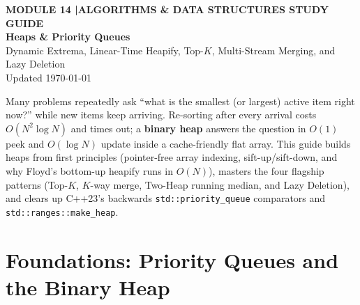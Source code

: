 \documentclass[11pt,a4paper]{article}
\newcommand{\sectionbreak}{}
\theoremstyle{definition}
\begin{document}
\thispagestyle{plain}
\begin{tcolorbox}[
    enhanced,
    colback=primaryblue!6, colframe=primaryblue!20,
    borderline west={5pt}{0pt}{primaryblue},
    arc=4pt, boxrule=0.6pt,
    left=14pt, right=14pt, top=7pt, bottom=7pt,
    before skip=0pt, after skip=5pt
]
    {\footnotesize\bfseries\color{accentteal}MODULE 14 \quad|\quad ALGORITHMS \& DATA STRUCTURES STUDY GUIDE}\\[3pt]
    {\Huge\bfseries\color{primaryblue}Heaps \& Priority Queues}\\[3pt]
    {\large\color{codegray}Dynamic Extrema, Linear-Time Heapify, Top-$K$, Multi-Stream Merging, and Lazy Deletion}\\[4pt]
    {\footnotesize\color{codegray}Updated \today}
\end{tcolorbox}

\begin{overviewbox}
{\small Many problems repeatedly ask ``what is the smallest (or largest) active item right now?'' while new items keep arriving. Re-sorting after every arrival costs $O(N^2 \log N)$ and times out; a \textbf{binary heap} answers the question in $O(1)$ peek and $O(\log N)$ update inside a cache-friendly flat array. This guide builds heaps from first principles (pointer-free array indexing, sift-up/sift-down, and why Floyd's bottom-up heapify runs in $O(N)$), masters the four flagship patterns (Top-$K$, $K$-way merge, Two-Heap running median, and Lazy Deletion), and clears up C++23's backwards \texttt{std::priority\_queue} comparators and \texttt{std::ranges::make\_heap}.}
\end{overviewbox}

\vspace{-6pt}
{\setlength{\parskip}{0pt}\footnotesize
\titlespacing*{\section}{0pt}{2pt}{6pt}%
\makeatletter
\let\lm@orig@addvspace\addvspace
\renewcommand{\addvspace}[1]{\lm@orig@addvspace{0.18em plus 1pt}}
\makeatother
\tableofcontents}

\renewcommand{\sectionbreak}{\clearpage}

\section{Foundations: Priority Queues and the Binary Heap}
\end{document}

